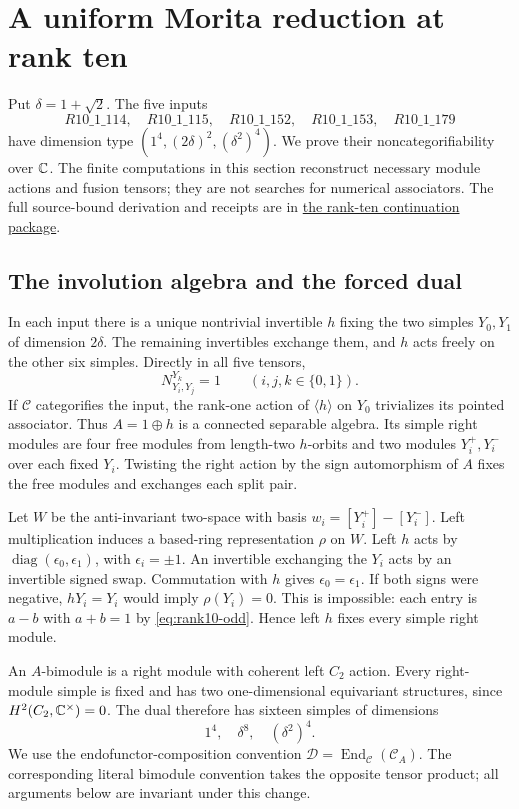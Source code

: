 \section{A uniform Morita reduction at rank ten}
\label{sec:rank10-morita}
Put $\delta=1+\sqrt2$. The five inputs
\[
 R10\_1\_114,\quad R10\_1\_115,\quad R10\_1\_152,
 \quad R10\_1\_153,\quad R10\_1\_179
\]
have dimension type $(1^4,(2\delta)^2,(\delta^2)^4)$.
We prove their noncategorifiability over $\mathbb C$. The finite computations in
this section reconstruct necessary module actions and fusion tensors;
they are not searches for numerical associators. The full source-bound
derivation and receipts are in
\href{https://github.com/sebastienpalcoux/grothendieck-ring-classification/tree/main/evidence/rank10_m1_exclusions_20261023}{the rank-ten continuation package}.

\subsection{The involution algebra and the forced dual}
In each input there is a unique nontrivial invertible $h$ fixing the two
simples $Y_0,Y_1$ of dimension $2\delta$. The remaining invertibles exchange
them, and $h$ acts freely on the other six simples. Directly in all five
tensors,
\begin{equation}\label{eq:rank10-odd}
 N_{Y_i,Y_j}^{Y_k}=1\qquad(i,j,k\in\{0,1\}).
\end{equation}
If $\mathcal C$ categorifies the input, the rank-one action of
$\langle h\rangle$ on $Y_0$ trivializes its pointed associator. Thus
$A=1\oplus h$ is a connected separable algebra. Its simple right modules
are four free modules from length-two $h$-orbits and two modules
$Y_i^+,Y_i^-$ over each fixed $Y_i$. Twisting the right action by the sign
automorphism of $A$ fixes the free modules and exchanges each split pair.

Let $W$ be the anti-invariant two-space with basis
$w_i=[Y_i^+]-[Y_i^-]$. Left multiplication induces a based-ring
representation $\rho$ on $W$. Left $h$ acts by
$\operatorname{diag}(\epsilon_0,\epsilon_1)$, with $\epsilon_i=\pm1$.
An invertible exchanging the $Y_i$ acts by an invertible signed swap.
Commutation with $h$ gives $\epsilon_0=\epsilon_1$. If both signs were
negative, $hY_i=Y_i$ would imply $\rho(Y_i)=0$. This is impossible:
each entry is $a-b$ with $a+b=1$ by \eqref{eq:rank10-odd}. Hence left
$h$ fixes every simple right module.

An $A$-bimodule is a right module with coherent left $C_2$ action.
Every right-module simple is fixed and has two one-dimensional equivariant
structures, since $H^2(C_2,\mathbb C^\times)=0$. The dual therefore has sixteen
simples of dimensions
\begin{equation}\label{eq:rank16-type}
 1^4,\quad\delta^8,\quad(\delta^2)^4.
\end{equation}
We use the endofunctor-composition convention
$\mathcal D=\operatorname{End}_{\mathcal C}(\mathcal C_A)$.
The corresponding literal bimodule convention takes the opposite tensor
product; all arguments below are invariant under this change.

